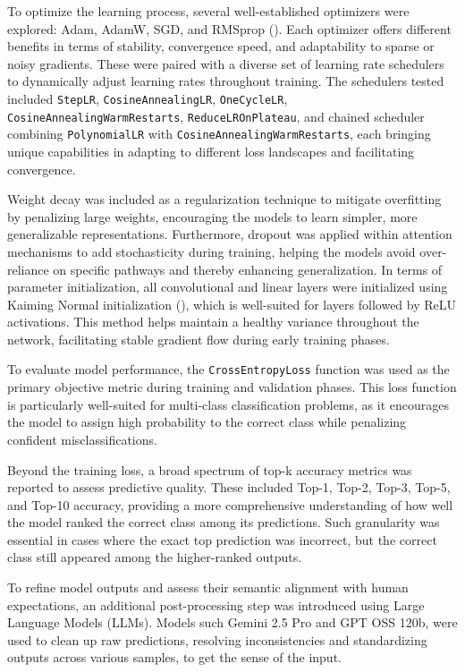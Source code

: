 \documentclass[a4paper,11pt,twoside]{report}
\theoremstyle{definition}
\begin{document}
To optimize the learning process, several well-established optimizers were explored: Adam, AdamW, SGD, and RMSprop (\cite{optimizers}). Each optimizer offers different benefits in terms of stability, convergence speed, and adaptability to sparse or noisy gradients. These were paired with a diverse set of learning rate schedulers to dynamically adjust learning rates throughout training. The schedulers tested included \texttt{StepLR}, \texttt{CosineAnnealingLR}, \texttt{OneCycleLR}, \texttt{CosineAnnealingWarmRestarts}, \texttt{ReduceLROnPlateau}, and chained scheduler combining \texttt{PolynomialLR} with \texttt{CosineAnnealingWarmRestarts}, each bringing unique capabilities in adapting to different loss landscapes and facilitating convergence.

Weight decay was included as a regularization technique to mitigate overfitting by penalizing large weights, encouraging the models to learn simpler, more generalizable representations. Furthermore, dropout was applied within attention mechanisms to add stochasticity during training, helping the models avoid over-reliance on specific pathways and thereby enhancing generalization. In terms of parameter initialization, all convolutional and linear layers were initialized using Kaiming Normal initialization (\cite{kaiming}), which is well-suited for layers followed by ReLU activations. This method helps maintain a healthy variance throughout the network, facilitating stable gradient flow during early training phases.

\vspace{0.3cm}

To evaluate model performance, the \texttt{CrossEntropyLoss} function was used as the primary objective metric during training and validation phases. This loss function is particularly well-suited for multi-class classification problems, as it encourages the model to assign high probability to the correct class while penalizing confident misclassifications.

Beyond the training loss, a broad spectrum of top-k accuracy metrics was reported to assess predictive quality. These included Top-1, Top-2, Top-3, Top-5, and Top-10 accuracy, providing a more comprehensive understanding of how well the model ranked the correct class among its predictions. Such granularity was essential in cases where the exact top prediction was incorrect, but the correct class still appeared among the higher-ranked outputs.

To refine model outputs and assess their semantic alignment with human expectations, an additional post-processing step was introduced using Large Language Models (LLMs). Models such Gemini 2.5 Pro and GPT OSS 120b, were used to clean up raw predictions, resolving inconsistencies and standardizing outputs across various samples, to get the sense of the input.
\end{document}
